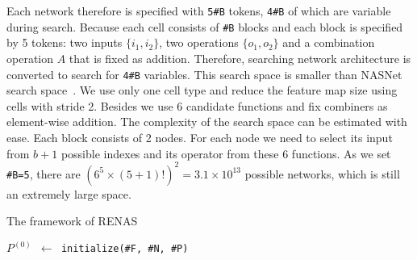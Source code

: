 \documentclass[10pt,twocolumn,letterpaper]{article}
\begin{document}
Each network therefore is specified with \texttt{5\#B} tokens, \texttt{4\#B} of which are variable during search. Because each cell consists of \texttt{\#B} blocks and each block is specified by 5 tokens: two inputs $\{i_{1}, i_{2}\}$, two operations $\{o_{1}, o_{2}\}$ and a combination operation $A$ that is fixed as addition.
 Therefore, searching network architecture is converted to search for \texttt{4\#B} variables.
This search space is smaller than NASNet search space~\cite{zoph2017learning}.
We use only one cell type and reduce the feature map size using cells with stride 2. Besides we use 6 candidate functions and fix combiners as element-wise addition.
The complexity of the search space can be estimated with ease. Each block consists of 2 nodes. For each node we need to select its input from $b + 1$ possible indexes and its operator from these 6 functions. As we set \texttt{\#B=5}, there are $(6^5 \times (5+1)!)^2 = 3.1 \times 10^{13}$ possible networks, which is still an extremely large  space.
\begin{algorithm}[t]
\caption{The framework of RENAS} \label{algo:1}

\begin{small}
\texttt{$P^{(0)}$ $\gets$ initialize(\#F, \#N, \#P)}


\end{small}
\end{algorithm}
\end{document}
